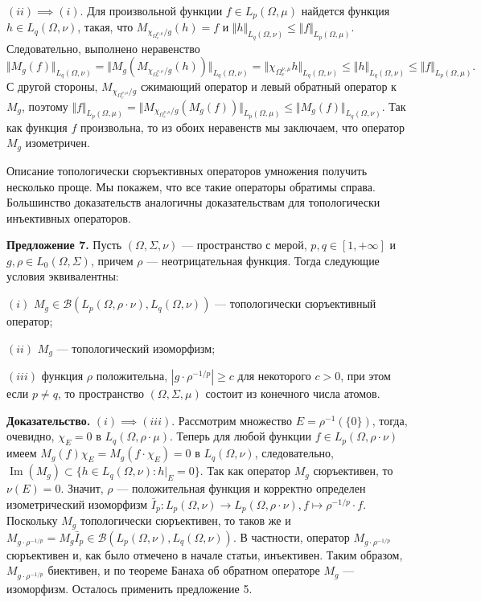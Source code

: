 \documentclass[11pt,twoside]{article}
\begin{document}
$(ii)$$\implies$$ (i)$. Для произвольной функции $f\in L_p(\Omega,\mu)$
найдется функция  $h\in L_q(\Omega,\nu)$, такая, что
$M_{\chi_{\Omega_c^{\nu,\mu}}/g}(h)=f$ и $\Vert
h\Vert_{L_q(\Omega,\nu)}\leq \Vert f\Vert_{L_p(\Omega,\mu)}$.
Следовательно, выполнено неравенство
$$
    \Vert M_g(f)\Vert_{L_q(\Omega,\nu)}
    =\Vert M_g(M_{\chi_{\Omega_c^{\nu,\mu}}/g}(h))\Vert_{L_q(\Omega,\nu)}
    =\Vert \chi_{\Omega_c^{\nu,\mu}}h\Vert_{L_q(\Omega,\nu)}
    \leq\Vert h\Vert_{L_q(\Omega,\nu)}
    \leq\Vert f\Vert_{L_p(\Omega,\mu)}.
$$
С другой стороны, $M_{\chi_{\Omega_c^{\nu,\mu}}/g}$ сжимающий оператор и левый
обратный оператор к  $M_g$, поэтому $\Vert f\Vert_{L_p(\Omega,\mu)} =\Vert
M_{\chi_{\Omega_c^{\nu,\mu}}/g}(M_g(f))\Vert_{L_p(\Omega,\mu)} \leq\Vert
M_g(f)\Vert_{L_q(\Omega,\nu)}$. Так как функция $f$ произвольна, то из обоих
неравенств мы заключаем, что оператор $M_g$ изометричен.




Описание топологически сюръективных операторов умножения получить несколько
проще. Мы покажем, что все такие операторы обратимы справа. Большинство
доказательств аналогичны доказательствам для топологически инъективных
операторов.

\textbf{Предложение 7.} Пусть $(\Omega,\Sigma,\nu)$ --- пространство с мерой,
$p,q\in[1,+\infty]$ и $g,\rho\in L_0(\Omega,\Sigma)$, причем $\rho$ ---
неотрицательная функция. Тогда следующие условия эквивалентны:

$(i)$ $M_g\in\mathcal{B}(L_p(\Omega,\rho\cdot\nu),L_q(\Omega,\nu))$ ---
топологически сюръективный оператор;

$(ii)$ $M_g$ --- топологический изоморфизм;

$(iii)$ функция $\rho$ положительна, $|g\cdot \rho^{-1/p}|\geq c$ для некоторого
$c>0$, при этом если $p\neq q$, то пространство $(\Omega,\Sigma,\mu)$ состоит из
конечного числа атомов.


\textbf{Доказательство.} $(i)$$\implies$$(iii)$. Рассмотрим множество
$E=\rho^{-1}(\{0\})$, тогда, очевидно, $\chi_E=0$ в
$L_q(\Omega,\rho\cdot\mu)$. Теперь для любой функции $f\in
L_p(\Omega,\rho\cdot\nu)$ имеем $M_g(f)\chi_E=M_g(f\cdot\chi_E)=0$ в
$L_q(\Omega,\nu)$, следовательно, $\operatorname{Im}(M_g)\subset \{h\in
L_q(\Omega,\nu): h|_E=0 \}$. Так как оператор $M_g$ сюръективен, то
$\nu(E)=0$. Значит, $\rho$ --- положительная функция и корректно определен
изометрический изоморфизм $\bar{I}_p:L_p(\Omega,\nu)\to
L_p(\Omega,\rho\cdot\nu),f\mapsto \rho^{-1/p}\cdot f$. Поскольку $M_g$
топологически сюръективен, то таков же и $M_{g\cdot\rho^{-1/p}}=M_g
\bar{I}_p\in\mathcal{B}(L_p(\Omega,\nu),L_q(\Omega,\nu))$. В частности,
оператор $M_{g\cdot\rho^{-1/p}}$ сюръективен и, как было отмечено в начале
статьи, инъективен. Таким образом, $M_{g\cdot\rho^{-1/p}}$ биективен, и по
теореме Банаха об обратном операторе $M_g$ --- изоморфизм. Осталось
применить предложение 5.
\end{document}
